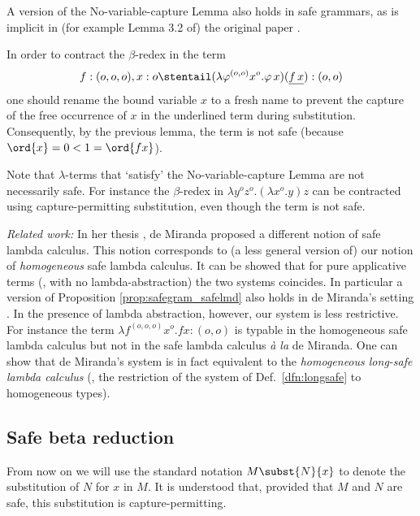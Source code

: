 \begin{remark}
  A version of the No-variable-capture Lemma also holds in safe
  grammars, as is implicit in (for example Lemma 3.2 of) the original
  paper \cite{KNU02}.
\end{remark}

\begin{example}
  In order to contract the $\beta$-redex in the term
\[f:(o,o,o),x:o
  \stentail (\lambda \varphi^{(o,o)} x^o . \varphi \, x) (\underline{f \,
    x}) : (o,o)\] one should rename the bound variable $x$ to a fresh name to
  prevent the capture of the free occurrence of $x$ in the underlined term during substitution. Consequently, by the previous lemma,
  the term is not safe (because $\ord{x} = 0 < 1
  = \ord{f x}$).
\end{example}

Note that $\lambda$-terms that `satisfy' the No-variable-capture
Lemma are not necessarily safe. For instance the $\beta$-redex in
$\lambda y^o z^o. (\lambda x^o .y) z$ can be contracted using
capture-permitting substitution, even though the term is not safe.
\bigskip

\emph{Related work:} In her thesis \cite{demirandathesis}, de Miranda proposed a different notion of safe lambda calculus. This notion corresponds to (a less general version of) our notion of \emph{homogeneous} safe lambda calculus. It can be showed that for pure applicative terms (\ie, with no lambda-abstraction) the two systems coincides. In particular a version of Proposition \ref{prop:safegram_safelmd} also holds in de Miranda's setting \cite{demirandathesis}. In the presence of lambda abstraction, however, our system is less restrictive. For instance the term $\lambda f^{(o,o,o)} x^o.  f x : (o,o)$ is typable in the homogeneous safe lambda calculus but not in the safe lambda calculus \emph{\`a la} de Miranda. One can show that de Miranda's system is in fact equivalent to the \emph{homogeneous long-safe lambda calculus} (\ie, the restriction of the system of Def.\ \ref{dfn:longsafe} to homogeneous types).

\subsection*{Safe beta reduction}

From now on we will use the standard notation $M\subst{N}{x}$ to
denote the substitution of $N$ for $x$ in $M$.  It is understood that,
provided that $M$ and $N$ are safe, this substitution is
capture-permitting.


